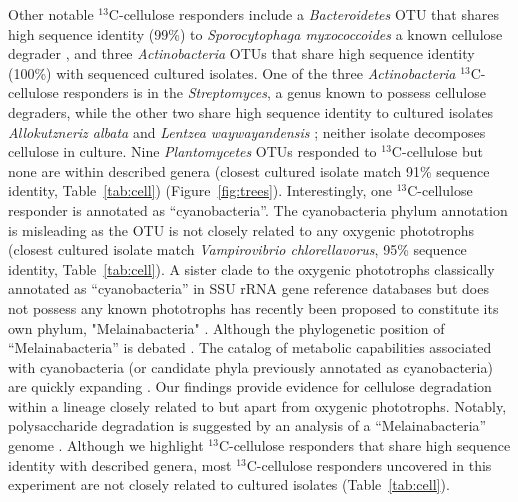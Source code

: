 Other notable $^{13}$C-cellulose responders include a \textit{Bacteroidetes}
OTU that shares high sequence identity (99\%) to \textit{Sporocytophaga
myxococcoides} a known cellulose degrader \citep{Vance_1980}, and three
\textit{Actinobacteria} OTUs that share high sequence identity (100\%) with
sequenced cultured isolates. One of the three \textit{Actinobacteria}
$^{13}$C-cellulose responders is in the \textit{Streptomyces}, a genus known to
possess cellulose degraders, while the other two share high sequence identity
to cultured isolates \textit{Allokutzneriz albata} \citep{Labeda_2008,
Tomita_1993} and \textit{Lentzea waywayandensis} \citep{LABEDA_1989,
Labeda_2001}; neither isolate decomposes cellulose in culture. Nine
\textit{Plantomycetes} OTUs responded to $^{13}$C-cellulose but none are within
described genera (closest cultured isolate match 91\% sequence identity,
Table~\ref{tab:cell}) (Figure~\ref{fig:trees}). Interestingly, one
$^{13}$C-cellulose responder is annotated as ``cyanobacteria''.
The cyanobacteria phylum annotation is misleading as the OTU is not closely
related to any oxygenic phototrophs (closest cultured isolate match
\textit{Vampirovibrio chlorellavorus}, 95\% sequence identity,
Table~\ref{tab:cell}). A sister clade to the oxygenic phototrophs classically
annotated as ``cyanobacteria'' in SSU rRNA gene reference databases but does
not possess any known phototrophs has recently been proposed to constitute its own
phylum, "Melainabacteria" \citet{Di_Rienzi_2013}. Although the phylogenetic
position of ``Melainabacteria'' is debated \citep{Soo_2014}. The catalog of
metabolic capabilities associated with cyanobacteria (or candidate phyla
previously annotated as cyanobacteria) are quickly expanding
\citep{Di_Rienzi_2013, Soo_2014}.  Our findings provide evidence for cellulose
degradation within a lineage closely related to but apart from oxygenic
phototrophs. Notably, polysaccharide degradation is suggested by an analysis of
a ``Melainabacteria'' genome \citep{Di_Rienzi_2013}. Although we highlight
$^{13}$C-cellulose responders that share high sequence identity with described
genera, most $^{13}$C-cellulose responders uncovered in this experiment are not
closely related to cultured isolates (Table~\ref{tab:cell}).